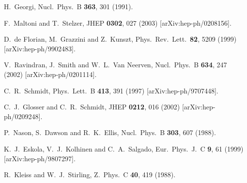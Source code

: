 \documentclass[12pt]{article}
\begin{document}
\begin{thebibliography}{99}
%
H.~Georgi,
Nucl.\ Phys.\ B {\bf 363}, 301 (1991).

F.~Maltoni and T.~Stelzer,
JHEP {\bf 0302}, 027 (2003)
[arXiv:hep-ph/0208156].

D.~de Florian, M.~Grazzini and Z.~Kunszt,
Phys.\ Rev.\ Lett.\  {\bf 82}, 5209 (1999)
[arXiv:hep-ph/9902483].

V.~Ravindran, J.~Smith and W.~L.~Van Neerven,
Nucl.\ Phys.\ B {\bf 634}, 247 (2002)
[arXiv:hep-ph/0201114].

C.~R.~Schmidt,
Phys.\ Lett.\ B {\bf 413}, 391 (1997)
[arXiv:hep-ph/9707448].

C.~J.~Glosser and C.~R.~Schmidt,
JHEP {\bf 0212}, 016 (2002)
[arXiv:hep-ph/0209248].

P.~Nason, S.~Dawson and R.~K.~Ellis,
Nucl.\ Phys.\ B {\bf 303}, 607 (1988).

  K.~J.~Eskola, V.~J.~Kolhinen and C.~A.~Salgado,
  Eur.\ Phys.\ J.\ C {\bf 9}, 61 (1999)
  [arXiv:hep-ph/9807297].
  
R.~Kleiss and W.~J.~Stirling,
Z.\ Phys.\ C {\bf 40}, 419 (1988).

\end{thebibliography}
\end{document}

